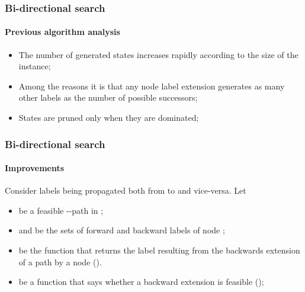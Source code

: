 \begin{frame}
  \frametitle{Bi-directional search}
  \framesubtitle{Previous algorithm analysis}
  \begin{itemize}
    \item The number of generated states increases rapidly according to the size of the instance;
    \item Among the reasons it is that any node  label extension generates as many other labels as the number of  possible successors;
    \item States are pruned only when they are dominated;
  \end{itemize}
\end{frame}

\begin{frame}
  \frametitle{Bi-directional search}
  \framesubtitle{Improvements}
  Consider labels being propagated both from  to  and vice-versa.
  Let
  \begin{itemize}
    \item {} be a feasible --path in ;
    \item {} and  be the sets of forward and backward labels of node ;
    \item {}  be the function that returns the label resulting from the backwards extension of a path  by a node  ().
    \item \blue{\[
        f^b(S_j, i) =  
        \begin{cases}
          \text{\textcolor{black}{true}},  & \text{\textcolor{black}{if} }      \forall r \in R (l^r_j - d_{ij}^r \leqslant e_i^r) \wedge \neg v_j^i\\
          \text{\textcolor{black}{false}}, & \text{\textcolor{black}{otherwise}}
        \end{cases}
    \]} be a function that says whether a backward extension is feasible ();
  \end{itemize}
\end{frame}

